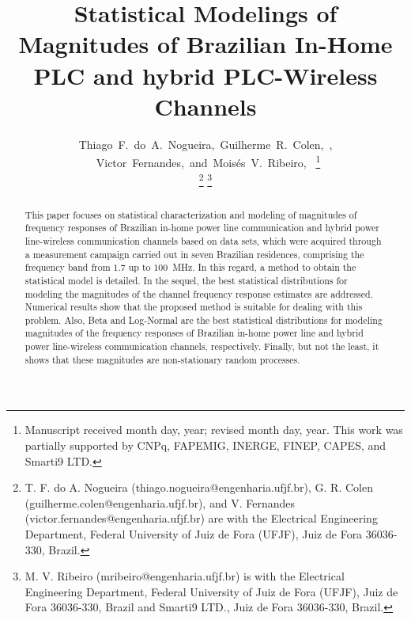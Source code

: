 \documentclass[journal]{IEEEtran}
\begin{document}

\title{Statistical Modelings of Magnitudes of Brazilian In-Home PLC and hybrid PLC-Wireless Channels}

\author{Thiago~F.~do~A.~Nogueira,~Guilherme~R.~Colen,~,
	~Victor~Fernandes,~and~Mois\'{e}s~V.~Ribeiro,~
\thanks{Manuscript received month day, year; revised month day, year. This work was partially supported by CNPq, FAPEMIG, INERGE, FINEP, CAPES, and Smarti9 LTD.} 

\thanks{T. F. do A. Nogueira (thiago.nogueira@engenharia.ufjf.br), G. R. Colen (guilherme.colen@engenharia.ufjf.br), and V. Fernandes (victor.fernandes@engenharia.ufjf.br) are with the Electrical Engineering Department, Federal University of Juiz	de Fora (UFJF), Juiz de Fora 36036-330, Brazil.}
\thanks{M. V. Ribeiro (mribeiro@engenharia.ufjf.br) is with the Electrical Engineering
	Department, Federal University of Juiz de Fora (UFJF), Juiz de Fora 36036-330, Brazil and Smarti9 LTD., Juiz de Fora 36036-330, Brazil.}}


\maketitle

\begin{abstract}
This paper focuses on statistical characterization and modeling of magnitudes of frequency responses of Brazilian in-home power line communication and hybrid power line-wireless communication channels based on data sets, which were acquired through a measurement campaign carried out in seven Brazilian residences, comprising the frequency band from $1.7$ up to $100$~MHz. In this regard, a method to obtain the statistical model is detailed. In the sequel, the best statistical distributions for modeling the magnitudes of the channel frequency response estimates are addressed. Numerical results show that the proposed method is suitable for dealing with this problem. Also, Beta and Log-Normal are the best statistical distributions for modeling magnitudes of the frequency responses of Brazilian in-home power line and hybrid power line-wireless communication channels, respectively. Finally, but not the least, it shows that these magnitudes are non-stationary random processes.   

\end{abstract}
\end{document}

